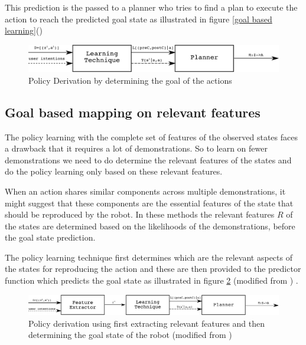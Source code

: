 This prediction is the passed to a planner who tries to find a plan to execute
the action to reach the predicted goal state as illustrated in figure \ref{goal
based learning}(\cite{argall_survey_2009})
\begin{figure}[htp]
\centering
\includegraphics[scale=0.8]{images/plans_policy_derivation.png}
\caption[Deriving a policy : goal based]{Policy Derivation by determining the
goal of the actions \cite{argall_survey_2009}}
\label{goal based learning}
\end{figure}
\subsection {Goal based mapping on relevant features}

The policy learning with the complete set of features of the observed states
faces a drawback that it requires a lot of demonstrations. So to learn on fewer
demonstrations we need to do determine the relevant features of the states and
do the policy learning only based on these relevant features.

When an action shares similar components across multiple demonstrations, it
might suggest that these components are the essential features of the state
that should be reproduced by the robot. In these methods the relevant features
$R$ of the states are determined based on the likelihoods of the
demonstrations, before the goal state prediction.

The policy learning technique first determines which are the relevant aspects
of the states for reproducing the action and these are then provided to the
predictor function which predicts the goal state as illustrated in figure
\ref{feature goal based learning}  (modified from \cite{argall_survey_2009}) .

\begin{figure}[htp]
\centering
\includegraphics[scale=0.6]{images/features_plans_policy_derivation.png}
\caption[Deriving a policy : feature based ]{Policy derivation using first
extracting relevant features and then determining the goal state of the robot
(modified from \cite{argall_survey_2009})}
\label{feature goal based learning}
\end{figure}

